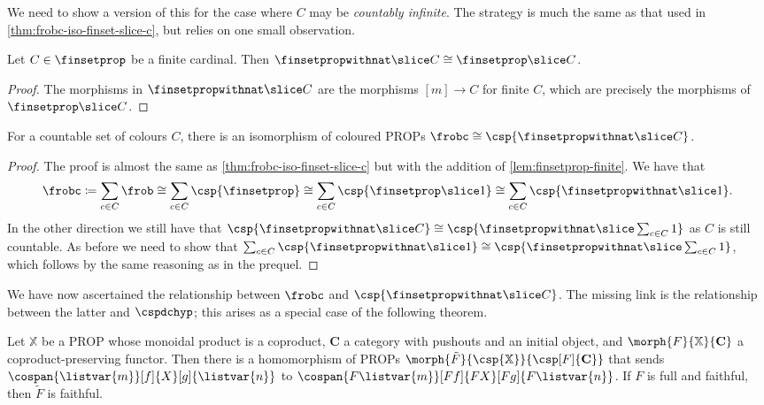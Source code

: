 We need to show a version of this for the case where \(C\) may be
\emph{countably infinite}.
The strategy is much the same as that used in
\cref{thm:frobc-iso-finset-slice-c}, but relies on one small observation.

\begin{lemma}
    \label{lem:finsetprop-finite}
    Let \(C \in \finsetprop\) be a finite cardinal.
    Then \(\finsetpropwithnat \slice C \cong \finsetprop \slice C\).
\end{lemma}
\begin{proof}
    The morphisms in \(\finsetpropwithnat \slice C\) are the morphisms
    \([m] \to C\) for finite \(C\), which are precisely the morphisms of
    \(\finsetprop \slice C\).
\end{proof}

\begin{theorem}
    \label{thm:frobc-iso-hatfinset-slice-c}
    For a countable set of colours \(C\), there is an isomorphism of coloured
    PROPs \(\frobc \cong \csp{\finsetpropwithnat \slice C}\).
\end{theorem}
\begin{proof}
    The proof is almost the same as \cref{thm:frobc-iso-finset-slice-c} but with
    the addition of \cref{lem:finsetprop-finite}.
    We have that \[
        \frobc
        \coloneqq
        \sum_{c \in C}\frob
        \cong
        \sum_{c \in C}\csp{\finsetprop}
        \cong
        \sum_{c \in C}\csp{\finsetprop \slice 1}
        \cong
        \sum_{c \in C}\csp{\finsetpropwithnat \slice 1}.
    \]
    In the other direction we still have that \(
        \csp{\finsetpropwithnat \slice C}
        \cong
        \csp{\finsetpropwithnat \slice \sum_{c \in C} 1}
    \) as \(C\) is still countable.
    As before we need to show that \(
        \sum_{c \in C}\csp{\finsetpropwithnat \slice 1}
        \cong
        \csp{\finsetpropwithnat \slice \sum_{c \in C} 1}
    \), which follows by the same reasoning as in the prequel.
\end{proof}

We have now ascertained the relationship between \(\frobc\) and
\(\csp{\finsetpropwithnat \slice C}\).
The missing link is the relationship between the latter and \(\cspdchyp\);
this arises as a special case of the following theorem.

\begin{theorem}
    \label{thm:cospan-homomorphism}
    Let \(\mathbb{X}\) be a PROP whose monoidal product is a coproduct,
    \(\mathbf{C}\) a category with pushouts and an initial object, and
    \(\morph{F}{\mathbb{X}}{\mathbf{C}}\) a coproduct-preserving functor.
    Then there is a homomorphism of PROPs \(
        \morph{\tilde{F}}{\csp{\mathbb{X}}}{\csp[F]{\mathbf{C}}}
    \) that sends \(\cospan{\listvar{m}}[f]{X}[g]{\listvar{{n}}}\) to
    \(\cospan{F\listvar{m}}[Ff]{FX}[Fg]{F\listvar{n}}\).
    If \(F\) is full and faithful, then \(\tilde{F}\) is faithful.
\end{theorem}

